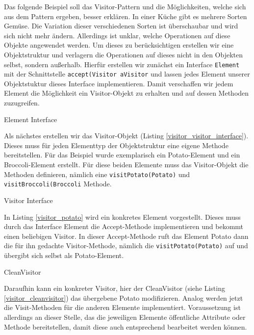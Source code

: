 
Das folgende Beispiel soll das Visitor-Pattern und die Möglichkeiten, welche sich aus dem Pattern ergeben, besser erklären. In einer Küche gibt es mehrere Sorten Gemüse. Die Variation dieser verschiedenen Sorten ist überschaubar und wird sich nicht mehr ändern. Allerdings ist unklar, welche Operationen auf diese Objekte angewendet werden. Um dieses zu berücksichtigen erstellen wir eine Objektstruktur und verlagern die Operationen auf dieses nicht in den Objekten selbst, sondern außerhalb. Hierfür erstellen wir zunächst ein Interface \texttt{Element} mit der Schnittstelle \texttt{accept(Visitor aVisitor} und lassen jedes Element unserer Objektstuktur dieses Interface implementieren. Damit verschaffen wir jedem Element die Möglichkeit ein Visitor-Objekt zu erhalten und auf dessen Methoden zuzugreifen.


\begin{listing}[h!]
   \centering
   \caption{Element Interface}
    \label{visitor_element_interface}
\end{listing}  

Als nächstes erstellen wir das Visitor-Objekt (Listing \ref{visitor_visitor_interface}). Dieses muss für jeden Elementtyp der Objektstruktur eine eigene Methode bereitstellen. Für das Beispiel wurde exemplarisch ein Potato-Element und ein Broccoli-Element erstellt. Für diese beiden Elemente muss das Visitor-Objekt die Methoden definieren, nämlich eine \texttt{visitPotato(Potato)} und \texttt{visitBroccoli(Broccoli} Methode.


\begin{listing}[h!]
   \centering
   \caption{Visitor Interface}
    \label{visitor_visitor_interface}
\end{listing}  

In Listing \ref{visitor_potato} wird ein konkretes Element vorgestellt. Dieses muss durch das Interface Element die Accept-Methode implementieren und bekommt einen beliebigen Visitor.
In dieser Accept-Methode ruft das Element Potato dann die für ihn gedachte Visitor-Methode, nämlich die \texttt{visitPotato(Potato)} auf und übergibt sich selbst als Potato-Element.

\begin{listing}[h!]
   \centering
   \caption{CleanVisitor}
    \label{visitor_potato}
\end{listing}  

Daraufhin kann ein konkreter Visitor, hier der CleanVisitor (siehe Listing \ref{visitor_cleanvisitor}) das übergebene Potato modifizieren. Analog werden jetzt die Visit-Methoden für die anderen Elemente implementiert. Voraussetzung ist allerdings an dieser Stelle, das die jeweiligen Elemente öffentliche Attribute oder Methode bereitstellen, damit diese auch entsprechend bearbeitet werden können.

